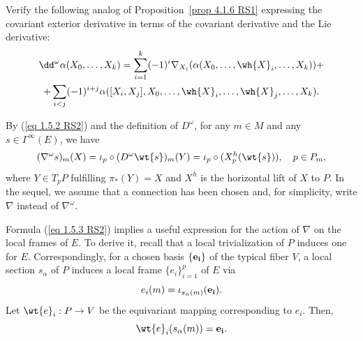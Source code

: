 \begin{xca}
    Verify the following analog of Proposition~\ref{prop 4.1.6 RS1} expressing the covariant exterior derivative in terms of the covariant derivative and the Lie derivative:
        \begin{multline}
            \dd^\omega \alpha(X_0,\ldots,X_k)= \sum_{i=1}^k(-1)^i \nabla_{X_i}(\alpha(X_0,\ldots,\wh{X}_i,\ldots,X_k))+\\+\sum_{i<j}(-1)^{i+j}\alpha([X_i,X_j],X_0,\ldots,\wh{X}_i,\ldots,\wh{X}_j,\ldots,X_k).
        \end{multline}
\end{xca}

By (\ref{eq 1.5.2 RS2}) and the definition of $D^\omega$, for any $m\in M$ and any $s\in \Gamma^\infty(E)$, we have
\[(\nabla^\omega s)_m(X)=\iota_p\circ (D^\omega \wt{s})_m(Y)=\iota_p\circ (X_p^h(\wt{s})),\quad p\in P_m,\label{eq 1.5.3 RS2}\]
where $Y\in T_pP$ fulfilling $\pi_\ast(Y)=X$ and $X^h$ is the horizontal lift of $X$ to $P$. In the sequel, we assume that a connection has been chosen and, for simplicity, write $\nabla$ instead of $\nabla^\omega$.

Formula (\ref{eq 1.5.3 RS2}) implies a useful expression for the action of $\nabla$ on the local frames of $E$. To derive it, recall that a local trivialization of $P$ induces one for $E$. Correspondingly, for a chosen basis $\{\bf{e}_i\}$ of the typical fiber $V$, a local section $s_\alpha$ of $P$ induces a local frame $\{e_i\}_{i=1}^p$ of $E$ via
\[e_i(m)=\iota_{s_\alpha(m)}(\bf{e}_i).\label{eq 1.5.4 RS2}\]
Let $\wt{e}_i:P\to V$ be the equivariant mapping corresponding to $e_i$. Then,
\[\wt{e}_i(s_\alpha(m))=\bf{e}_i.\label{eq 1.5.5 RS2}\]

